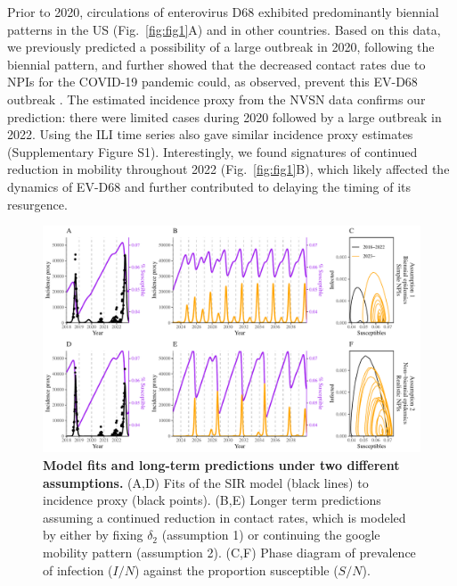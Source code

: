 \documentclass[12pt]{article}
\newcommand{\fref}[1]{Fig.~\ref{fig:#1}}
\begin{document}
Prior to 2020, circulations of enterovirus D68 exhibited predominantly biennial patterns in the US (\fref{fig1}A) and in other countries.
Based on this data, we previously predicted a possibility of a large outbreak in 2020, following the biennial pattern, and further showed that the decreased contact rates due to NPIs for the COVID-19 pandemic could, as observed, prevent this EV-D68 outbreak \citep{park2021epidemiological}.
The estimated incidence proxy from the NVSN data \citep{ma2022increase} confirms our prediction: there were limited cases during 2020 followed by a large outbreak in 2022.
Using the ILI time series also gave similar incidence proxy estimates (Supplementary Figure S1).
Interestingly, we found signatures of continued reduction in mobility throughout 2022 (\fref{fig1}B), which likely affected the dynamics of EV-D68 and further contributed to delaying the timing of its resurgence.

\begin{figure}[!th]
\includegraphics[width=\textwidth]{../figure_pub/figure2.pdf}
\caption{
\textbf{Model fits and long-term predictions under two different assumptions.}
(A,D) Fits of the SIR model (black lines) to incidence proxy (black points).
(B,E) Longer term predictions assuming a continued reduction in contact rates, which is modeled by either by fixing $\delta_2$ (assumption 1) or continuing the google mobility pattern (assumption 2).
(C,F) Phase diagram of prevalence of infection ($I/N$) against the proportion susceptible ($S/N$).
}
\label{fig:fig2}
\end{figure}
\end{document}
